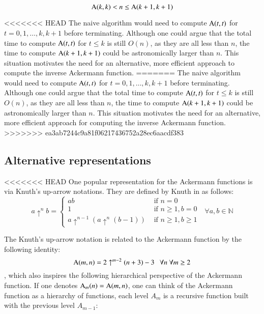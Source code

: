 \begin{equation}
\text{A}(k, k) < n \le \text{A}(k+1, k+1)
\end{equation}

<<<<<<< HEAD
The naive algorithm would need to compute $\text{A}(t, t)$ for $t = 0, 1, \ldots, k, k+1$ before terminating. Although one could argue that the total time to compute $\text{A}(t, t)$ for $t\le k$ is still $O(n)$, as they are all less than $n$, the time to compute $\text{A}(k+1, k+1)$ could be astronomically larger than $n$. This situation motivates the need for an alternative, more efficient approach to compute the inverse Ackermann function.
=======
The naive algorithm would need to compute 
$\text{A}(t, t)$ for $t = 0, 1, \ldots, k, k+1$ before terminating. 
{\color{magenta} Although one could argue that the total time to 
compute $\text{A}(t, t)$ for $t\le k$ is still $O(n)$, as they are all 
less than $n$, the time to compute $\text{A}(k+1, k+1)$ could be 
astronomically larger than $n$.} This situation motivates the 
need for an alternative, more efficient approach for computing 
the inverse Ackermann function.
>>>>>>> ea3ab7244c9a81f06217436752a28ec6aacdf383

\subsection{Alternative representations}

<<<<<<< HEAD
One popular representation for the Ackermann functions is via Knuth's up-arrow notations. They are defined by Knuth in \cite{knuth} as follows:
\begin{equation}
a\uparrow^n b = \begin{cases}
ab & \text{ if } n = 0 \\ 1 & \text{ if } n \ge 1, b = 0 \\
a \uparrow^{n-1} (a \uparrow^n (b - 1)) & \text{ if } n \ge 1, b \ge 1
\end{cases} \ \ \ \forall a, b \in \mathbb{N}
\end{equation}

The Knuth's up-arrow notation is related to the Ackermann function by the following identity:
\begin{equation}
\text{A}(m, n) = 2 \uparrow^{m-2} (n + 3) - 3 \ \ \ \forall n \ \forall m \ge 2
\end{equation}
, which also inspires the following hierarchical perspective of the Ackermann function.
If one denotes $\text{A}_m(n) = \text{A}(m, n)$, one can think of the Ackermann function as a hierarchy of functions, each level $A_m$ is a recursive function built with the previous level $A_{m-1}$:

